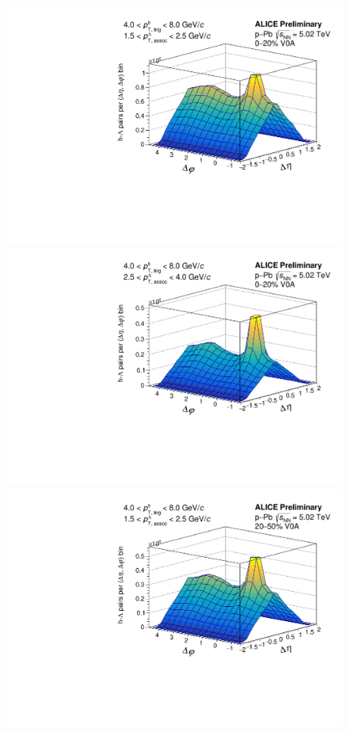 \begin{figure}[ht]
	\centering
	\begin{minipage}{0.48\textwidth}
		\includegraphics[width=\textwidth]{figures/analysis/h_lambda_2d_nomixcor_fancy_label_0_20_lowpt.pdf}
	\end{minipage}
	\begin{minipage}{0.48\textwidth}
		\includegraphics[width=\textwidth]{figures/analysis/h_lambda_2d_nomixcor_fancy_label_0_20_highpt.pdf}
	\end{minipage}
	\begin{minipage}{0.48\textwidth}
		\includegraphics[width=\textwidth]{figures/analysis/h_lambda_2d_nomixcor_fancy_label_20_50_lowpt.pdf}

\end{minipage}
\end{figure}
